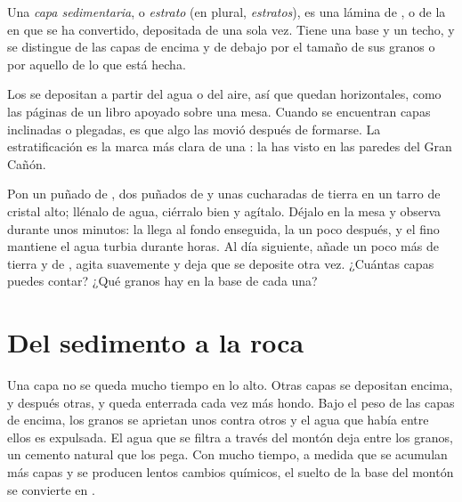 \begin{definition}\label{def:g7:sediments-and-fossils:layer}
Una \emph{capa sedimentaria}, o
\emph{estrato} (en plural, \emph{estratos}), es una lámina
de , o de la  en que se ha convertido, depositada de una sola
vez. Tiene una base y un techo, y se distingue de las capas de encima y de
debajo por el tamaño de sus granos o por aquello de lo que está hecha.
\end{definition}

Los  se depositan a partir del agua o del aire, así que quedan
horizontales, como las páginas de un libro apoyado sobre una mesa. Cuando
se encuentran capas inclinadas o plegadas, es que algo las movió después
de formarse. La estratificación es la marca más clara de una : la has visto en las paredes del Gran Cañón.

\begin{inthelab}
Pon un puñado de , dos puñados de  y unas cucharadas de tierra
en un tarro de cristal alto; llénalo de agua, ciérralo bien y agítalo.
Déjalo en la mesa y observa durante unos minutos: la  llega al fondo
enseguida, la  un poco después, y el  fino mantiene el agua
turbia durante horas. Al día siguiente, añade un poco más de tierra y de
, agita suavemente y deja que se deposite otra vez. ¿Cuántas capas
puedes contar? ¿Qué granos hay en la base de cada una?
\end{inthelab}

\section{Del sedimento a la roca}

Una capa no se queda mucho tiempo en lo alto. Otras capas se depositan
encima, y después otras, y queda enterrada cada vez más hondo. Bajo el
peso de las capas de encima, los granos se aprietan unos contra otros y el
agua que había entre ellos es expulsada. El agua que se filtra a través
del montón deja  entre los granos, un cemento natural que los
pega. Con mucho tiempo, a medida que se acumulan más capas y se producen
lentos cambios químicos, el  suelto de la base del montón se
convierte en .

